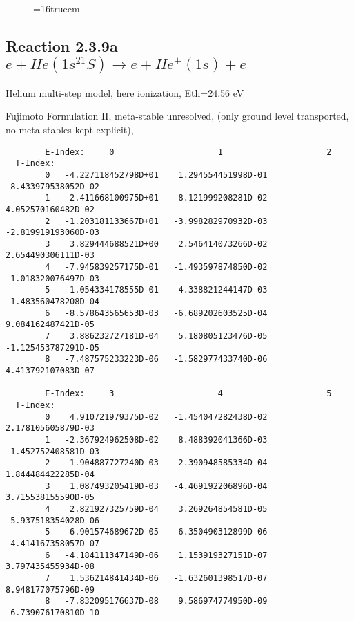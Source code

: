 \documentclass[12pt,dvipdfmx]{article}
\begin{document}
{\begin{small}
\begin{verbatim}
\end{verbatim}\end{small}
\begin{figure} \label{2.2.14}
\epsfxsize=16truecm
\end{figure}
\newpage




\subsection{
Reaction 2.3.9a  $e + He(1s^21S) \rightarrow  e + He^+(1s) + e $
}
Helium multi-step model, here ionization, Eth=24.56 eV

 Fujimoto Formulation II, meta-stable unresolved, (only ground level transported, no meta-stables
 kept explicit), \cite{kn:Fujimoto}



\begin{small}\begin{verbatim}
        E-Index:     0                     1                     2
  T-Index:
        0   -4.227118452798D+01    1.294554451998D-01   -8.433979538052D-02
        1    2.411668100975D+01   -8.121999208281D-02    4.052570160482D-02
        2   -1.203181133667D+01   -3.998282970932D-03   -2.819919193060D-03
        3    3.829444688521D+00    2.546414073266D-02    2.654490306111D-03
        4   -7.945839257175D-01   -1.493597874850D-02   -1.018320076497D-03
        5    1.054334178555D-01    4.338821244147D-03   -1.483560478208D-04
        6   -8.578643565653D-03   -6.689202603525D-04    9.084162487421D-05
        7    3.886232727181D-04    5.180805123476D-05   -1.125453787291D-05
        8   -7.487575233223D-06   -1.582977433740D-06    4.413792107083D-07

        E-Index:     3                     4                     5
  T-Index:
        0    4.910721979375D-02   -1.454047282438D-02    2.178105605879D-03
        1   -2.367924962508D-02    8.488392041366D-03   -1.452752408581D-03
        2   -1.904887727240D-03   -2.390948585334D-04    1.844484422285D-04
        3    1.087493205419D-03   -4.469192206896D-04    3.715538155590D-05
        4    2.821927325759D-04    3.269264854581D-05   -5.937518354028D-06
        5   -6.901574689672D-05    6.350490312899D-06   -4.414167358057D-07
        6   -4.184111347149D-06    1.153919327151D-07    3.797435455934D-08
        7    1.536214841434D-06   -1.632601398517D-07    8.948177075796D-09
        8   -7.832095176637D-08    9.586974774950D-09   -6.739076170810D-10


\end{verbatim}
\end{small}}
\end{document}
